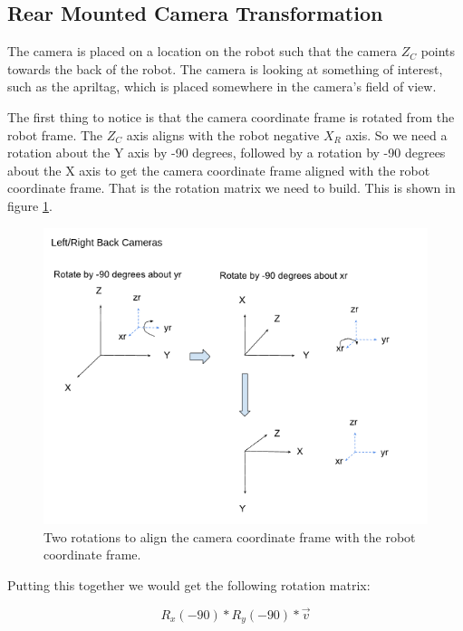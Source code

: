 \documentclass[11pt]{article}
\begin{document}
\subsection{Rear Mounted Camera Transformation}

The camera is placed on a location on the robot such that the camera $Z_C$ points towards
the back of the robot.  The camera is looking at something of interest, such as the apriltag,
which is placed somewhere in the camera's field of view.


The first thing to notice is that the camera coordinate frame is rotated from the robot
frame.  The $Z_C$ axis aligns with the robot negative $X_R$ axis.  So we need a rotation
about the Y axis by -90 degrees, followed by a rotation by -90 degrees about the X axis to 
get the camera coordinate frame aligned with the robot coordinate frame.  That is the rotation 
matrix we need to build. This is shown in figure \ref{fig:rotations2}.

\begin{figure}[h!]
    \centering
    \includegraphics[scale=0.5]{figures/rotations2.png}
    \caption{Two rotations to align the camera coordinate frame with the robot coordinate frame.}
    \label{fig:rotations2}
\end{figure}

Putting this together we would get the following rotation matrix:

\begin{equation}
    R_x(-90) * R_y(-90) * \vec{v}
\end{equation}
\end{document}
